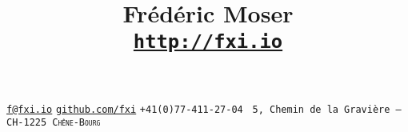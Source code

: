 

\title{Frédéric Moser \\ {\small \href{http://fxi.io}{\tt http://fxi.io}}}

\maketitle


{\small
  \faPencil \hspace{0.2em} \href{mailto:f@fxi.io?Subject=job}{\tt f@fxi.io}\hfill
    \faGithub \hspace{0.2em} \href{https://github.com/fxi}{\tt github.com/fxi}\hfill
    \faPhone \hspace{0.2em} {\tt +41(0)77-411-27-04 \hfill}
  \faHome \hspace{0.2em} {\tt 5, Chemin de la Gravière -- CH-1225 \textsc{Chêne-Bourg}}
}

